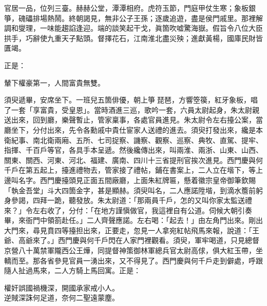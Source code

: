 \begin{myquote}
官居一品，位列三臺。赫赫公堂，潭潭相府。虎符玉節，門庭甲仗生寒；象板銀箏，磈礧排場熱鬧。終朝謁見，無非公子王孫；逐歲追遊，盡是侯門戚里。那裡解調和燮理，一味能趨諂逢迎。端的談笑起干戈，眞箇吹嘘驚海嶽。假旨令八位大臣拱手，巧辭使九重天子點頭。督擇花石，江南淮北盡災殃；進獻黃楊，國庫民財皆匱竭。
\end{myquote}

正是：

\begin{myquote}
輦下權豪第一，人間富貴無雙。
\end{myquote}

須臾遞畢，安席坐下。一班兒五箇俳優，朝上箏𥱧琵琶，方響箜篌，紅牙象板，唱了一套「享富貴，受皇恩」。當時酒進三巡，歌吟一套，六員太尉起身，朱太尉親送出來，回到廳，樂聲暫止，管家稟事，各處官員進見。朱太尉令左右擡公案，當廳坐下，分付出來，先令各勳戚中貴仕宦家人送禮的進去。須臾打發出來，纔是本衛紀事、南北衛兩廂、五所、七司捉察、譏察、觀察、巡察、典牧、直駕、提牢、指揮、千百戶等官，各具手本呈遞。然後纔傳出來，叫兩淮、兩浙、山東、山西、關東、關西、河東、河北、福建、廣南、四川十三省提刑官挨次進見。西門慶與何千戶在第五起上，擡進禮物去，管家接了禮帖，鋪在書案上，二人立在堦下，等上邊叫名字。西門慶擡頭見正面五間廠廳，上面朱紅牌匾，懸着徽宗皇帝御筆欽賜「執金吾堂」斗大四箇金字，甚是顯赫。須臾叫名，二人應諾陞堦，到滴水簷前躬身參謁，四拜一跪，聽發放。朱太尉道：「那兩員千戶，怎的又叫你家太監送禮來？」令左右收了，分付：「在地方謹愼做官，我這裡自有公道。伺候大朝引奏畢，來衙門中領箚赴任。」二人齊聲應諾。左右喝：「起去！」由左角門出來。剛出大門來，尋見賁四等擡担出來，正要走，忽見一人拿宛紅帖飛馬來報，說道：「王爺、高爺來了。」西門慶與何千戶閃在人家門裡觀看。須臾，軍牢喝道，只見總督京營八十萬禁軍隴西公王燁，同提督神策御林軍總兵官太尉高俅，俱大紅玉帶，坐轎而至。那各省參見官員一湧出來，又不得見了。西門慶與何千戶走到僻處，呼跟隨人扯過馬來，二人方騎上馬回寓。正是：

\begin{myquote}
權奸誤國禍機深，開國承家戒小人。\\逆賊深誅何足道，奈何二聖遠蒙塵。
\end{myquote}

